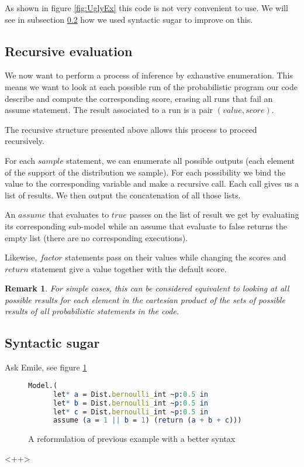 \documentclass{article}
\newcommand\SC[1]{{\color{violet}{\it \bf Simon :} #1}}
\newtheorem{remark}{Remark}
\begin{document}
	As shown in figure \ref{fig:UglyEx} this code is not very convenient to use. We will see in subsection \ref{subseq:sugar} how we used syntactic sugar to improve on this.

	\subsection{Recursive evaluation}

	We now want to perform a process of inference by exhaustive enumeration.
	This means we want to look at each possible run of the probabilistic program our code describe and compute the corresponding score, erasing all runs that fail an assume statement.
	The result associated to a run is a pair $(value, score)$.

	The recursive structure presented above allows this process to proceed recursively.

	For each $sample$ statement, we can enumerate all possible outputs (each element of the support of the distribution we sample). For each possibility we bind the value to the corresponding variable and make a recursive call.
	Each call gives us a list of results. We then output the concatenation of all those lists.

	An $assume$ that evaluates to $true$ passes on the list of result we get by evaluating its corresponding sub-model while an assume that evaluate to false returns the empty list (there are no corresponding executions).

	Likewise, $factor$ statements pass on their values while changing the scores and $return$ statement give a value together with the default score.

	\begin{remark}
	  For simple cases, this can be considered equivalent to looking at all possible results for each element in the cartesian product of the sets of possible results of all probabilistic statements in the code.
	\end{remark}

	\subsection{Syntactic sugar}
	\label{subseq:sugar}

	\SC{Ask Emile, see figure \ref{fig:sugar}}

	\begin{figure}[h]
	  \centering
	\begin{lstlisting}[language=Mathematica,frame=single]
    Model.(
      let* a = Dist.bernoulli_int ~p:0.5 in
      let* b = Dist.bernoulli_int ~p:0.5 in
      let* c = Dist.bernoulli_int ~p:0.5 in
      assume (a = 1 || b = 1) (return (a + b + c)))
	\end{lstlisting}
	\caption{A reformulation of previous example with a better syntax}
	  \label{fig:sugar}
	\end{figure}<++>
\end{document}
